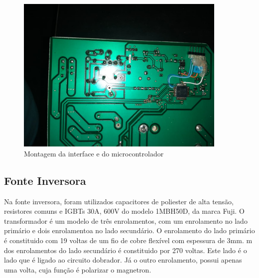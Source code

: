 \begin{figure}[H]
    \centering
    \includegraphics[width=0.9\textwidth]{./dados/figuras/placa_shunt}
    \caption{Montagem da interface  e do microcontrolador}
    \label{fig:figura-montagem-shunt-uc}
\end{figure}

\subsection{Fonte Inversora}
Na fonte inversora, foram utilizados capacitores de poliester de alta tensão, resistores comuns e IGBTs 30A, 600V do modelo 1MBH50D, da marca Fuji. O transformador é um modelo de três enrolamentos, com um enrolamento no lado primário e dois enrolamentoa no lado secundário. O enrolamento do lado primário é constituido com 19 voltas de um fio de cobre flexível com espessura de 3mm. m dos enrolamentos do lado secundário é constituido por 270 voltas. Este lado é o lado que é ligado ao circuito dobrador. Já o outro enrolamento, possui apenas uma volta, cuja função é polarizar o magnetron.

